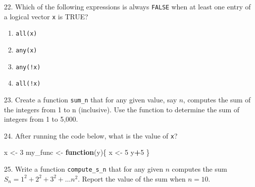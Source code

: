 \documentclass[
]{article}
\newenvironment{Shaded}{\begin{snugshade}}{\end{snugshade}}
\newcommand{\ControlFlowTok}[1]{\textcolor[rgb]{0.13,0.29,0.53}{\textbf{#1}}}
\newcommand{\DecValTok}[1]{\textcolor[rgb]{0.00,0.00,0.81}{#1}}
\newcommand{\NormalTok}[1]{#1}
\newcommand{\OtherTok}[1]{\textcolor[rgb]{0.56,0.35,0.01}{#1}}
\newcommand{\SpecialCharTok}[1]{\textcolor[rgb]{0.81,0.36,0.00}{\textbf{#1}}}
\providecommand{\tightlist}{%
  \setlength{\itemsep}{0pt}\setlength{\parskip}{0pt}}
\begin{document}
22. Which of the following expressions is always \texttt{FALSE} when at
least one entry of a logical vector \texttt{x} is TRUE?

\begin{enumerate}
\def\labelenumi{\alph{enumi}.}
\tightlist
\item
  \texttt{all(x)}
\item
  \texttt{any(x)}
\item
  \texttt{any(!x)}
\item
  \texttt{all(!x)}
\end{enumerate}

23. Create a function \texttt{sum\_n} that for any given value, say
\(n\), computes the sum of the integers from 1 to n (inclusive). Use the
function to determine the sum of integers from 1 to 5,000.

24. After running the code below, what is the value of \texttt{x}?

\begin{Shaded}
\begin{Highlighting}[]
\NormalTok{x }\OtherTok{\textless{}{-}} \DecValTok{3}
\NormalTok{my\_func }\OtherTok{\textless{}{-}} \ControlFlowTok{function}\NormalTok{(y)\{}
\NormalTok{  x }\OtherTok{\textless{}{-}} \DecValTok{5}
\NormalTok{  y}\SpecialCharTok{+}\DecValTok{5}
\NormalTok{\}}
\end{Highlighting}
\end{Shaded}

25. Write a function \texttt{compute\_s\_n} that for any given \(n\)
computes the sum \(S_n = 1^2 + 2^2 + 3^2 + \dots n^2\). Report the value
of the sum when \(n=10\).
\end{document}
